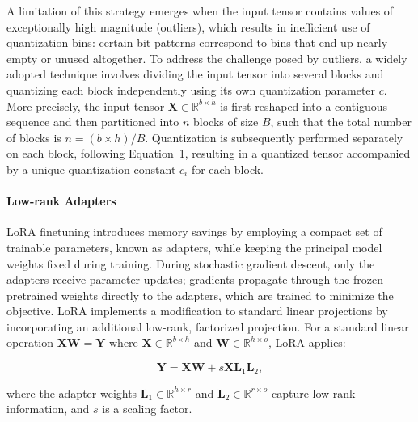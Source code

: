A limitation of this strategy emerges when the input tensor contains values of exceptionally high magnitude (outliers), which results in inefficient use of quantization bins: certain bit patterns correspond to bins that end up nearly empty or unused altogether. To address the challenge posed by outliers, a widely adopted technique involves dividing the input tensor into several blocks and quantizing each block independently using its own quantization parameter $c$. More precisely, the input tensor $\mathbf{X}\in \mathbb{R}^{b\times h}$ is first reshaped into a contiguous sequence and then partitioned into $n$ blocks of size $B$, such that the total number of blocks is $n = ({b\times h})/{B}$. Quantization is subsequently performed separately on each block, following Equation~1, resulting in a quantized tensor accompanied by a unique quantization constant $c_i$ for each block.

\paragraph{Low-rank Adapters} LoRA finetuning \citep{hu2021lora} introduces memory savings by employing a compact set of trainable parameters, known as adapters, while keeping the principal model weights fixed during training. During stochastic gradient descent, only the adapters receive parameter updates; gradients propagate through the frozen pretrained weights directly to the adapters, which are trained to minimize the objective. LoRA implements a modification to standard linear projections by incorporating an additional low-rank, factorized projection. For a standard linear operation ${\mathbf{X} \mathbf{W} = \mathbf{Y}}$ where $\mathbf{X}\in  \mathbb{R}^{b\times h}$ and $\mathbf{W}\in  \mathbb{R}^{h\times o}$, LoRA applies:

\begin{equation}
    \mathbf{Y} = \mathbf{X}\mathbf{W} + s\mathbf{X}\mathbf{L}_1\mathbf{L}_2,
\end{equation}

where the adapter weights $\mathbf{L}_1\in  \mathbb{R}^{h\times r}$ and $\mathbf{L}_2\in  \mathbb{R}^{r\times o}$ capture low-rank information, and $s$ is a scaling factor.


